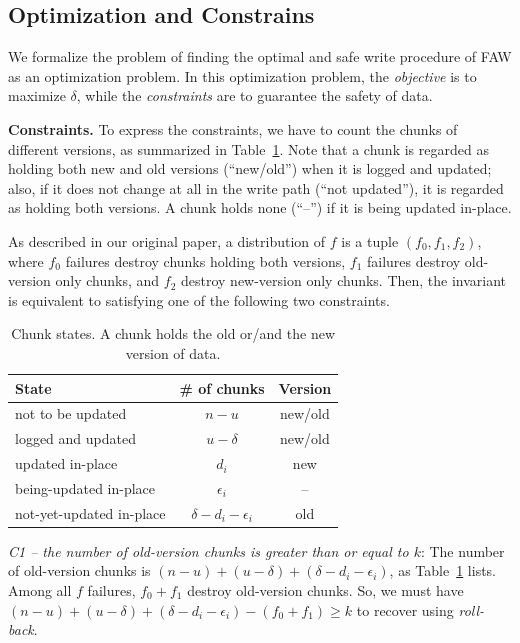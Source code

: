 \documentclass[letterpaper,10pt,twocolumn]{article}
\def\protocol/{FAW}
\begin{document}
\subsection{Optimization and Constrains}

We formalize the problem of finding the optimal and safe write procedure of \protocol/ as an optimization problem. 
In this optimization problem, the \emph{objective} is to maximize $\delta$, while the \emph{constraints} are to guarantee the safety of data.

\noindent
\textbf{Constraints.} To express the constraints, we have to count the chunks of different versions, as summarized in Table~\ref{tab:states}.
Note that a chunk is regarded as holding both new and old versions (``new/old'') when it is logged and updated; also, if it does not change at all in the write
path (``not updated''), it is regarded as holding both versions. A chunk
holds none (``--'') if it is being updated in-place.

As described in our original paper, a distribution of $f$ is a tuple $(f_0, f_1, f_2)$, where $f_0$ failures destroy
chunks holding both versions, $f_1$ failures destroy old-version only chunks,
and $f_2$ destroy new-version only chunks. Then, the invariant is equivalent to
satisfying one of the following two constraints.

\begin{table}[!b]
\centering
\begin{tabular}{l|c|c}
\hline
State & \# of chunks & Version \\
\hline
not to be updated & $n - u$ & new/old \\
logged and updated & $u - \delta$ & new/old \\
updated in-place & $d_i$ & new \\
being-updated in-place & $\epsilon_i$ & -- \\
not-yet-updated in-place & $\delta - d_i - \epsilon_i$ & old \\
\hline
\end{tabular}
\caption{Chunk states. A chunk holds the old or/and the new version of data.  }
\label{tab:states}
\end{table}

\emph{C1 -- the number of old-version chunks is greater than or equal to $k$}: The number of old-version chunks is $(n -
u) + (u - \delta) + (\delta - d_i - \epsilon_i)$, as Table~\ref{tab:states}
lists. Among all $f$ failures, $f_0 + f_1$ destroy old-version chunks.
So, we must have $(n - u) + (u - \delta) + (\delta -
d_i - \epsilon_i) - (f_0 + f_1) \ge k$ to recover using \emph{roll-back}.
\end{document}
